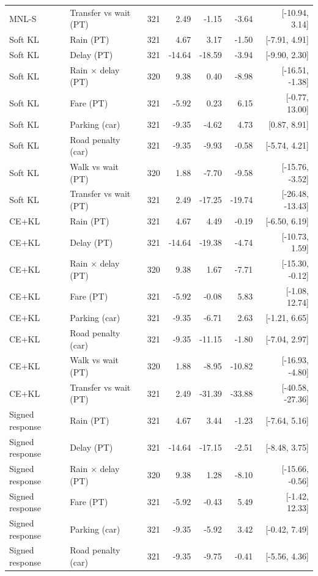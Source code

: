 \begin{longtable}{@{\extracolsep{\fill}}llrrrrr@{}}
MNL-S & Transfer vs wait (PT) & 321 & 2.49 & -1.15 & -3.64 & [-10.94, 3.14] \\
Soft KL & Rain (PT) & 321 & 4.67 & 3.17 & -1.50 & [-7.91, 4.91] \\
Soft KL & Delay (PT) & 321 & -14.64 & -18.59 & -3.94 & [-9.90, 2.30] \\
Soft KL & Rain $\times$ delay (PT) & 320 & 9.38 & 0.40 & -8.98 & [-16.51, -1.38] \\
Soft KL & Fare (PT) & 321 & -5.92 & 0.23 & 6.15 & [-0.77, 13.00] \\
Soft KL & Parking (car) & 321 & -9.35 & -4.62 & 4.73 & [0.87, 8.91] \\
Soft KL & Road penalty (car) & 321 & -9.35 & -9.93 & -0.58 & [-5.74, 4.21] \\
Soft KL & Walk vs wait (PT) & 320 & 1.88 & -7.70 & -9.58 & [-15.76, -3.52] \\
Soft KL & Transfer vs wait (PT) & 321 & 2.49 & -17.25 & -19.74 & [-26.48, -13.43] \\
CE+KL & Rain (PT) & 321 & 4.67 & 4.49 & -0.19 & [-6.50, 6.19] \\
CE+KL & Delay (PT) & 321 & -14.64 & -19.38 & -4.74 & [-10.73, 1.59] \\
CE+KL & Rain $\times$ delay (PT) & 320 & 9.38 & 1.67 & -7.71 & [-15.30, -0.12] \\
CE+KL & Fare (PT) & 321 & -5.92 & -0.08 & 5.83 & [-1.08, 12.74] \\
CE+KL & Parking (car) & 321 & -9.35 & -6.71 & 2.63 & [-1.21, 6.65] \\
CE+KL & Road penalty (car) & 321 & -9.35 & -11.15 & -1.80 & [-7.04, 2.97] \\
CE+KL & Walk vs wait (PT) & 320 & 1.88 & -8.95 & -10.82 & [-16.93, -4.80] \\
CE+KL & Transfer vs wait (PT) & 321 & 2.49 & -31.39 & -33.88 & [-40.58, -27.36] \\
Signed response & Rain (PT) & 321 & 4.67 & 3.44 & -1.23 & [-7.64, 5.16] \\
Signed response & Delay (PT) & 321 & -14.64 & -17.15 & -2.51 & [-8.48, 3.75] \\
Signed response & Rain $\times$ delay (PT) & 320 & 9.38 & 1.28 & -8.10 & [-15.66, -0.56] \\
Signed response & Fare (PT) & 321 & -5.92 & -0.43 & 5.49 & [-1.42, 12.33] \\
Signed response & Parking (car) & 321 & -9.35 & -5.92 & 3.42 & [-0.42, 7.49] \\
Signed response & Road penalty (car) & 321 & -9.35 & -9.75 & -0.41 & [-5.56, 4.36] \\

\end{longtable}
